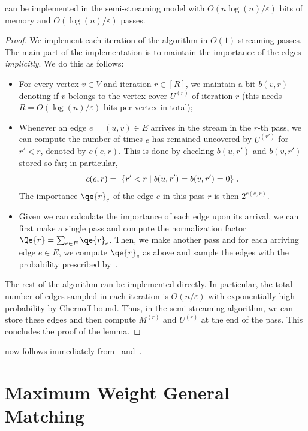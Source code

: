 \documentclass{article}
\DeclarePairedDelimiter{\card}{\vert}{\vert}
\DeclarePairedDelimiter{\set}{\{}{\}}
\newcommand{\eps}{\varepsilon}
\begin{document}
\begin{lemma}\label{lem:semi-stream-bipartite}
	 can be implemented in the semi-streaming model with $O(n\log{\!(n)}/\eps)$ bits of memory and $O(\log{\!(n)}/\eps)$ passes. 
\end{lemma}
\begin{proof}
	We implement each iteration of the algorithm in $O(1)$ streaming passes. The main part of the  implementation is to maintain the importance of the edges \emph{implicitly}. We do this as follows: 
	\begin{itemize}
	\item For every vertex $v \in V$ and iteration $r \in [R]$, 
	we maintain a  bit $b(v,r)$ denoting if $v$ belongs to the vertex cover $U^{(r)}$ of iteration $r$ (this needs $R = O(\log\!{(n)}/\eps)$ bits per vertex in total);
	\item Whenever an edge $e=(u,v) \in E$ arrives in the stream in the $r$-th pass, we can compute the number of times $e$ has remained uncovered by $U^{(r')}$ for $r' < r$, denoted by $c(e,r)$. This is done by checking $b(u,r')$ and $b(v,r')$ stored
	so far; in particular, 
	\[
	c(e,r) = \card{\set{r' < r \mid b(u,r') = b(v,r') = 0}}.
	\]
	 The importance $\qe{r}_e$ of the edge $e$ in this pass $r$ is then $2^{c(e,r)}$. 
	\item Given we can calculate the importance of each edge upon its arrival, we can first make a single pass and compute the normalization factor $\Qe{r} = \sum_{e \in E} \qe{r}_e$. Then, 
	we make another pass and for each arriving edge $e \in E$, we compute $\qe{r}_e$ as above and sample the edges with the probability prescribed by~. 
	\end{itemize} 
	
	The rest of the algorithm can be implemented directly. In particular, the total number of edges sampled in each iteration is $O(n/\eps)$ with exponentially high probability by Chernoff bound. Thus, in the semi-streaming algorithm, 
	we can store these edges and then compute $M^{(r)}$ and $U^{(r)}$ at the end of the pass. This concludes the proof of the lemma. 
\end{proof}

 now follows immediately from~ and~. 




\section{Maximum Weight General Matching}\label{sec:general}
\end{document}
